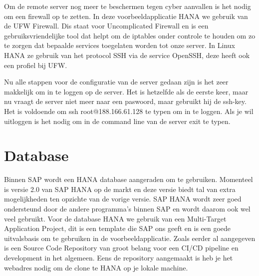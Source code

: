         Om de remote server nog meer te beschermen tegen cyber aanvallen is het nodig om een firewall op te zetten. In deze voorbeeldapplicatie HANA we gebruik van de UFW Firewall. Dis staat voor Uncomplicated Firewall en is een gebruiksvriendelijke tool dat helpt om de iptables onder controle te houden om zo te zorgen dat bepaalde services toegelaten worden tot onze server.
        In Linux HANA ze gebruik van het protocol SSH via de service OpenSSH, deze heeft ook een profiel bij UFW.
        
        Nu alle stappen voor de configuratie van de server gedaan zijn is het zeer makkelijk om in te loggen op de server.
        Het is hetzelfde als de eerste keer, maar nu vraagt de server niet meer naar een paswoord, maar gebruikt hij de ssh-key. Het is voldoende om 
        ssh root@188.166.61.128 te typen om in te loggen.
        Als je wil uitloggen is het nodig om in de command line van de server exit te typen.
    
    \section{Database}
    \label{sec:database}
    Binnen SAP wordt een HANA database aangeraden om te gebruiken. Momenteel is versie 2.0 van SAP HANA op de markt en deze versie biedt tal van extra mogelijkheden ten opzichte van de vorige versie. SAP HANA wordt zeer goed ondersteund door de andere programma's binnen SAP en wordt daarom ook wel veel gebruikt.
    Voor de database HANA we gebruik van een Multi-Target Application Project, dit is een template die SAP ons geeft en is een goede uitvalsbasis om te gebruiken in de voorbeeldapplicatie.
    Zoals eerder al aangegeven is een Source Code Repository van groot belang voor een CI/CD pipeline en development in het algemeen.
    Eens de repository aangemaakt is heb je het webadres nodig om de clone te HANA op je lokale machine.
    
